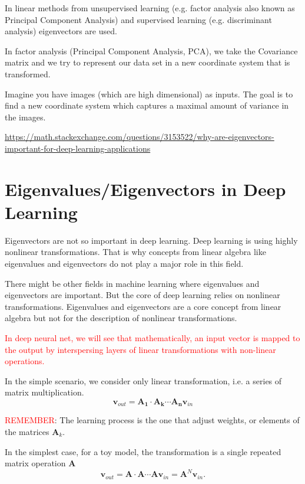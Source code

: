 In linear methods from unsupervised learning (e.g. factor analysis also known as
Principal Component Analysis) and supervised learning (e.g. discriminant
analysis) eigenvectors are used.

In factor analysis (Principal Component Analysis, PCA), we take the Covariance
matrix and we try to represent our data set in a new coordinate system that is
transformed.

Imagine you have images (which are high dimensional) as inputs. The goal is to
find a new coordinate system which captures a maximal amount of variance in the
images.

\url{https://math.stackexchange.com/questions/3153522/why-are-eigenvectors-important-for-deep-learning-applications}


\section{Eigenvalues/Eigenvectors in Deep Learning}
\label{sec:deep-learing-mathematical-intuition-init-weights}

Eigenvectors are not so important in deep learning. Deep learning is using
highly nonlinear transformations. That is why concepts from linear algebra like
eigenvalues and eigenvectors do not play a major role in this field.

There might be other fields in machine learning where eigenvalues and
eigenvectors are important. But the core of deep learning relies on nonlinear
transformations. Eigenvalues and eigenvectors are a core concept from linear
algebra but not for the description of nonlinear transformations.
 

\textcolor{red}{In deep neural net, we will see that mathematically, an input
vector is mapped to the output by interspersing layers
of linear transformations with non-linear operations.}

In the simple scenario, we consider only linear transformation, i.e.
a series of matrix multiplication.
\begin{equation}
\mathbf{v}_{out} = \mathbf{A_1}\cdot \mathbf{A_k}\cdots \mathbf{A_n} \mathbf{v}_{in}
\end{equation}

\textcolor{red}{REMEMBER}: The learning process is the one that adjust weights,
or elements of the matrices $\mathbf{A}_k$.

In the simplest case, for a toy model, the transformation is a single repeated matrix operation 
$\mathbf{A}$
\begin{equation}
\mathbf{v}_{out} = \mathbf{A}\cdot \mathbf{A}\cdots \mathbf{A} \mathbf{v}_{in} = \mathbf{A}^N \mathbf{v}_{in}.
\end{equation}

